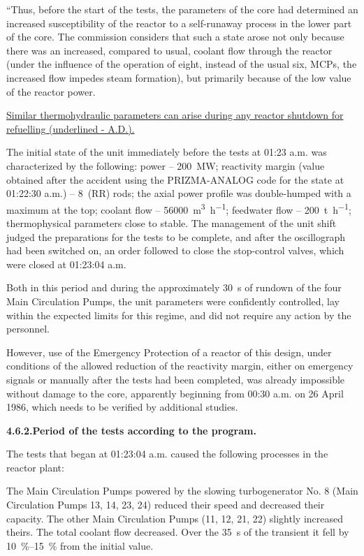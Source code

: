 \documentclass[openright]{bookest}
\begin{document}
\begin{personal}
``Thus, before the start of the tests, the parameters of the core had determined an increased susceptibility of the reactor to a self-runaway process in the lower part of the core. The commission considers that such a state arose not only because there was an increased, compared to usual, coolant flow through the reactor (under the influence of the operation of eight, instead of the usual six, MCPs, the increased flow impedes steam formation), but primarily because of the low value of the reactor power.

\ul{Similar thermohydraulic parameters can arise during any reactor shutdown for refuelling (underlined - A.D.).}

The initial state of the unit immediately before the tests at 01:23 a.m. was characterized by the following: power -- \qty{200}{\mega\watt}; reactivity margin (value obtained after the accident using the PRIZMA-ANALOG code for the state at 01:22:30 a.m.) -- 8~(RR) rods; the axial power profile was double-humped with a maximum at the top; coolant flow -- \qty{56000}{\meter\cubed\per\hour}; feedwater flow -- \qty{200}{\tonne\per\hour}; thermophysical parameters close to stable. The management of the unit shift judged the preparations for the tests to be complete, and after the oscillograph had been switched on, an order followed to close the stop-control valves, which were closed at 01:23:04 a.m.

Both in this period and during the approximately \qty{30}{\second} of rundown of the four Main Circulation Pumps, the unit parameters were confidently controlled, lay within the expected limits for this regime, and did not require any action by the personnel.

However, use of the Emergency Protection of a reactor of this design, under conditions of the allowed reduction of the reactivity margin, either on emergency signals or manually after the tests had been completed, was already impossible without damage to the core, apparently beginning from 00:30 a.m. on 26 April 1986, which needs to be verified by additional studies.

\textbf{4.6.2.\quad Period of the tests according to the program.}

The tests that began at 01:23:04 a.m. caused the following processes in the reactor plant:

The Main Circulation Pumps powered by the slowing turbogenerator No. 8 (Main Circulation Pumps 13, 14, 23, 24) reduced their speed and decreased their capacity. The other Main Circulation Pumps (11, 12, 21, 22) slightly increased theirs. The total coolant flow decreased. Over the \qty{35}{\second} of the transient it fell by \qtyrange{10}{15}{\percent} from the initial value.


\end{personal}
\end{document}

